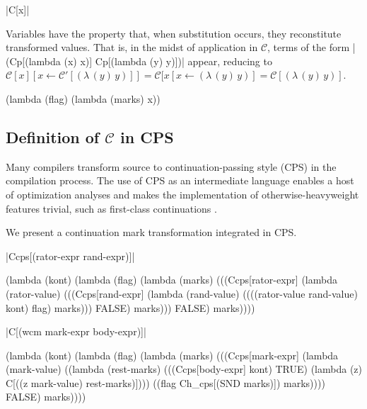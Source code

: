 \documentclass{llncs}
\newcommand{\abs}[2]{(\lambda\,(#1)\,#2)}
\newcommand{\C}[1]{\mathcal{C}[#1]}
\newcommand{\Cp}[1]{\mathcal{C}'[#1]}
\begin{document}
\begin{schemedefn}{\scheme|C[x]|}

Variables have the property that, when substitution occurs, they reconstitute transformed values. That is, in the midst of application in $\mathcal{C}$, terms of the form \scheme|(Cp[(lambda (x) x)] Cp[(lambda (y) y)])| appear, reducing to $\C{x}[x\leftarrow \Cp{\abs{y}{y}}]=\C{x[x\leftarrow\abs{y}{y}}=\C{\abs{y}{y}}$.
\begin{schemedisplay}
(lambda (flag)
  (lambda (marks)
    x))
\end{schemedisplay}
\end{schemedefn}

\subsection{Definition of $\mathcal{C}$ in CPS}

Many compilers transform source to continuation-passing style (CPS) in the compilation process. The use of CPS as an intermediate language enables a host of optimization analyses and makes the implementation of otherwise-heavyweight features trivial, such as first-class continuations \cite{appel2007compiling}.

We present a continuation mark transformation integrated in CPS.

\begin{schemedefn}{\scheme|Ccps[(rator-expr rand-expr)]|}
\begin{schemedisplay}
(lambda (kont)
   (lambda (flag)
     (lambda (marks)
       (((Ccps[rator-expr]
          (lambda (rator-value)
            (((Ccps[rand-expr]
               (lambda (rand-value)
                 ((((rator-value rand-value) kont) flag) marks)))
              FALSE)
             marks)))
         FALSE)
        marks))))
\end{schemedisplay}
\end{schemedefn}

\begin{schemedefn}{\scheme|C[(wcm mark-expr body-expr)]|}
\begin{schemedisplay}
(lambda (kont)
  (lambda (flag)
    (lambda (marks)
      (((Ccps[mark-expr]
          (lambda (mark-value) 
            ((lambda (rest-marks) 
               (((Ccps[body-expr] kont) TRUE) (lambda (z) C[((z mark-value) rest-marks)])))
             ((flag Ch_cps[(SND marks)]) marks))))
        FALSE)
       marks))))
\end{schemedisplay}
\end{schemedefn}
\end{document}
